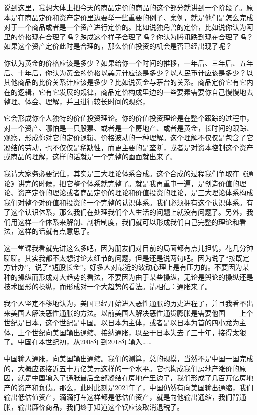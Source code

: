 \documentclass[UTF8, 12pt, a4paper]{ctexrep}
\begin{document}
说到这里，我想大体上把今天的商品定价的商品的这个部分就讲到一个阶段了。原本是在商品定价和资产定价里边要举一些重要的例子、案例，就是他们是怎么完成对于一个商品或者是一个资产进行定价的。比如说独角兽的定价，比如说你认为阿里的价格现在合理了吗？跌成这个样子合理了吗？你认为腾讯跌到现在合理了吗？如果这个资产定价此时是合理的，那么价值投资的机会是否已经出现了呢？

你认为黄金的价格应该是多少？如果给你一个时间的推移，一年后、三年后、五年后、十年后，你认为黄金的价格以美元计应该是多少？以人民币计应该是多少？以其他商品的比价关系计应该是多少？比如说黄金与茅台的关系。商品定价它有它内在的逻辑，它有它发展的规律，商品定价构成里边的一些要素需要你自己慢慢地去整理、体会、理解，并且进行较长时间的观察，

它会形成你个人独特的价值投资理论。你的价值投资理论是在整个跟踪的过程中，对一个资产、哪怕是一只股票、或者是一个房地产、或者是黄金，长时间的跟踪、观察，形成你对它的定价逻辑、价格波动的一种理解。这个理解不仅仅是包含了它凝结的劳动，也不仅仅是稀缺性，而更主要的是垄断，或者是对资本控制这个资产或商品的理解，这样的话就是一个完整的画面就出来了。

我请大家务必要记住，其实是三大理论体系合成。这个合成的过程我们争取在《通论》讲完的时候，把它整个体系就完整了。就是我再重申一遍，是创造价值的理论、资产定价的理论或者商品定价的理论和价值投资的理论，是三大理论体系构成我们对整个对价值和投资的一个完整的认识体系。我们必须拥有这个认识体系。有了这个认识体系，那么我们在处理我们个人生活的问题上就没有问题了。另外，我们用这样一个体系来解剖、剖析制度，我们就可以形成我们自己完整的理论和看法，这样的话就有点意思了。

这一堂课我看就先讲这么多吧，因为朋友们对目前的局面都有点儿担忧，花几分钟聊聊。其实我都不太想讨论太细节的问题，但是还是说两句吧。因为说了“按既定方针办”，说了“短股长金”，好多人对最近的波动心理上是有压力的。不要因为某种的操纵而形成对大趋势的看法，不要因为由于某些操纵，无论是舆论的操纵还是技术图形的操纵，而形成对一个大趋势的看法。请相信：通胀来了。

我个人坚定不移地认为，美国已经开始进入恶性通胀的历史进程了，并且我看不出来美国人解决恶性通胀的方法。以前美国人解决恶性通货膨胀是需要他国——上个世纪是日本，这个世纪是中国。以日本为主体，或者是以日本为首的四小龙为主体，上个世纪向美国输出通缩、接纳通胀，以至于日本失去了三十年，接得太狠了。中国在本世纪初，从2008年到2018年输入……

中国输入通胀，向美国输出通缩。我们的测算，总的规模，当然不是中国一国完成的，大概应该接近五十万亿美元这样的一个水平。它也构成我们房地产涨价的原因，就是中国输入了通胀最后全部凝结在房地产里边了，我们形成了几百万亿房地产的资产和负债。那么，此时此刻是2021年了，中国仍然有向美国输出通缩，我们输出低估值资产，滴滴打车这样都是低估值资产，就是向他输出通缩，我们背通胀，输出廉价商品，我们终于知道这个钢应该取消退税了。
\end{document}
